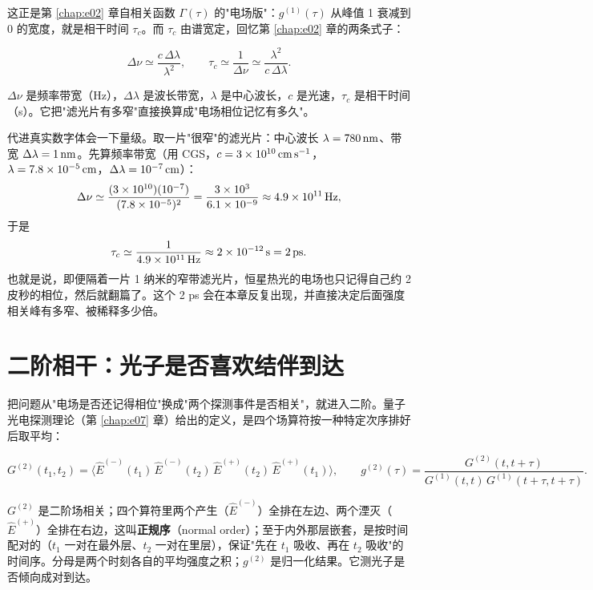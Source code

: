 这正是第 \ref{chap:e02} 章自相关函数 \(\Gamma(\tau)\) 的"电场版"：\(g^{(1)}(\tau)\) 从峰值 1 衰减到 0 的宽度，就是相干时间 \(\tau_c\)。而 \(\tau_c\) 由谱宽定，回忆第 \ref{chap:e02} 章的两条式子：

\begin{equation}
  \Delta\nu\simeq\frac{c\,\Delta\lambda}{\lambda^2},
  \qquad
  \tau_c\simeq\frac{1}{\Delta\nu}\simeq\frac{\lambda^2}{c\,\Delta\lambda}.
  \label{eq:e08-tauc}
\end{equation}
\begin{formulaexplain}
\(\Delta\nu\) 是频率带宽（Hz），\(\Delta\lambda\) 是波长带宽，\(\lambda\) 是中心波长，\(c\) 是光速，\(\tau_c\) 是相干时间（s）。它把"滤光片有多窄"直接换算成"电场相位记忆有多久"。
\end{formulaexplain}

代进真实数字体会一下量级。取一片"很窄"的滤光片：中心波长 \(\lambda=780\,{\rm nm}\)、带宽 \(\Delta\lambda=1\,{\rm nm}\)。先算频率带宽（用 CGS，\(c=3\times10^{10}\,{\rm cm\,s^{-1}}\)，\(\lambda=7.8\times10^{-5}\,{\rm cm}\)，\(\Delta\lambda=10^{-7}\,{\rm cm}\)）：
\[
  \Delta\nu\simeq\frac{(3\times10^{10})(10^{-7})}{(7.8\times10^{-5})^2}
  =\frac{3\times10^{3}}{6.1\times10^{-9}}
  \approx4.9\times10^{11}\,{\rm Hz},
\]
于是
\[
  \tau_c\simeq\frac{1}{4.9\times10^{11}\,{\rm Hz}}\approx2\times10^{-12}\,{\rm s}=2\,{\rm ps}.
\]
也就是说，即便隔着一片 1 纳米的窄带滤光片，恒星热光的电场也只记得自己约 2 皮秒的相位，然后就翻篇了。这个 2 ps 会在本章反复出现，并直接决定后面强度相关峰有多窄、被稀释多少倍。

\section{二阶相干：光子是否喜欢结伴到达}
\label{sec:e08-g2}

把问题从"电场是否还记得相位"换成"两个探测事件是否相关"，就进入二阶。量子光电探测理论（第 \ref{chap:e07} 章）给出的定义，是四个场算符按一种特定次序排好后取平均：

\begin{equation}
  G^{(2)}(t_1,t_2)=\big\langle
    \hat E^{(-)}(t_1)\,\hat E^{(-)}(t_2)\,\hat E^{(+)}(t_2)\,\hat E^{(+)}(t_1)
  \big\rangle,
  \qquad
  g^{(2)}(\tau)=\frac{G^{(2)}(t,t+\tau)}{G^{(1)}(t,t)\,G^{(1)}(t+\tau,t+\tau)} .
  \label{eq:e08-g2-field}
\end{equation}
\begin{formulaexplain}
\(G^{(2)}\) 是二阶场相关；四个算符里两个产生（\(\hat E^{(-)}\)）全排在左边、两个湮灭（\(\hat E^{(+)}\)）全排在右边，这叫\textbf{正规序}（normal order）；至于内外那层嵌套，是按时间配对的（\(t_1\) 一对在最外层、\(t_2\) 一对在里层），保证"先在 \(t_1\) 吸收、再在 \(t_2\) 吸收"的时间序。分母是两个时刻各自的平均强度之积；\(g^{(2)}\) 是归一化结果。它测光子是否倾向成对到达。
\end{formulaexplain}

